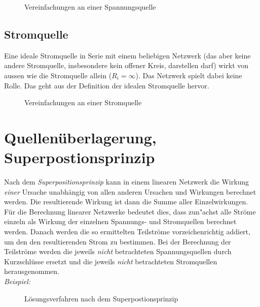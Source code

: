 \documentclass[german, 10pt, a4paper, headsepline]{scrreprt}
\theoremstyle{remark}
\begin{document}
\begin{figure}[hbt]
 
 \centerline{\box\graph}
 \caption{Vereinfachungen an einer Spannungsquelle}
\end{figure}

\subsection{Stromquelle}

Eine ideale Stromquelle in Serie mit einem beliebigen Netzwerk (das aber keine andere Stromquelle, insbesondere kein offener Kreis, darstellen darf) wirkt von aussen wie die Stromquelle allein ($R_i = \infty$). Das Netzwerk spielt dabei keine Rolle. Das geht aus der Definition der idealen Stromquelle hervor.

\begin{figure}[hbt]
 
 \centerline{\box\graph}
 \caption{Vereinfachungen an einer Stromquelle}
\end{figure}

\section{Quellen\"uberlagerung, Superpostionsprinzip}


Nach dem \textit{Superpositionsprinzip} kann in einem linearen Netzwerk die Wirkung \textit{einer} Ursache unabh\"angig von allen anderen Ursachen und Wirkungen berechnet werden. Die resultierende Wirkung ist dann die Summe aller Einzelwirkungen.\\

F\"ur die Berechnung linearer Netzwerke bedeutet dies, dass zun"achst alle Str\"ome einzeln als Wirkung der einzelnen Spannungs- und Stromquellen berechnet werden. Danach werden die so ermittelten Teilstr\"ome vorzeichenrichtig addiert, um den den resultierenden Strom zu bestimmen. Bei der Berechnung der Teilstr\"ome werden die jeweils \textit{nicht} betrachteten Spannungsquellen durch Kurzschl\"usse ersetzt und die jeweils \textit{nicht} betrachteten Stromquellen herausgenommen.\\

\textit{Beispiel:}\\

\begin{figure}[hbt]
 
 \centerline{\box\graph}
 \caption{L\"osungsverfahren nach dem Superpostionsprinzip}
 \label{superposition_fig}
\end{figure}
\end{document}
